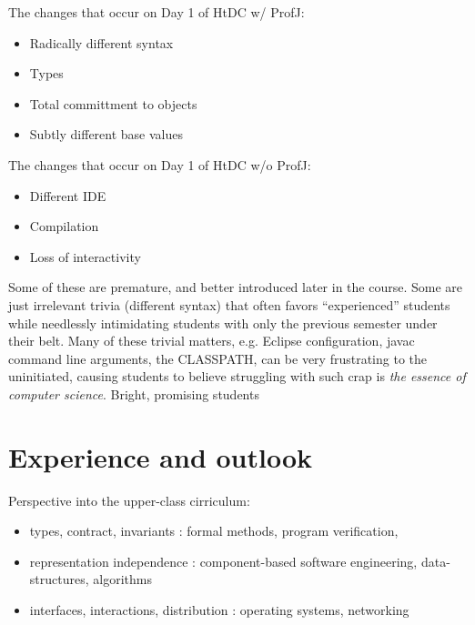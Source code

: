 \documentclass[submission,copyright]{eptcs}
\begin{document}
The changes that occur on Day 1 of HtDC w/ ProfJ:

\begin{itemize}
\item Radically different syntax
\item Types
\item Total committment to objects
\item Subtly different base values
\end{itemize}

The changes that occur on Day 1 of HtDC w/o ProfJ:

\begin{itemize}
\item Different IDE
\item Compilation
\item Loss of interactivity
\end{itemize}

Some of these are premature, and better introduced later in the
course.  Some are just irrelevant trivia (different syntax) that often
favors ``experienced'' students while needlessly intimidating students
with only the previous semester under their belt.  Many of these
trivial matters, e.g. Eclipse configuration, javac command line
arguments, the CLASSPATH, can be very frustrating to the uninitiated,
causing students to believe struggling with such crap is \emph{the
  essence of computer science}.  Bright, promising students 

\section{Experience and outlook}

Perspective into the upper-class cirriculum:

\begin{itemize}
\item types, contract, invariants : formal methods, program verification,
  
\item representation independence : component-based software engineering,
  data-structures, algorithms

\item interfaces, interactions, distribution : operating systems, networking
\end{itemize}

\nocite{*}


\end{document}
